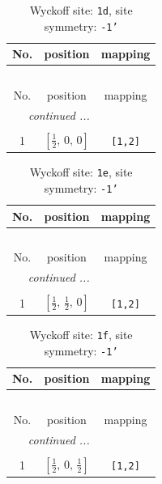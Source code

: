 \documentclass[fleqn,8pt]{jsarticle}
\begin{document}
\renewcommand{\arraystretch}{1.2}
\begin{longtable}{ccc}
\caption{Wyckoff site: {\tt 1d}, site symmetry: {\tt -1'}}
 \\
 \hline \hline
No. & position & mapping \\ \hline \endfirsthead

\multicolumn{2}{l}{\tablename\ \thetable{}} \\
 \hline \hline
No. & position & mapping \\ \hline \endhead

 \hline \hline
\multicolumn{2}{r}{\footnotesize\it continued ...} \\ \endfoot

 \hline \hline
\multicolumn{2}{r}{} \\ \endlastfoot

1 & $\left[ \frac{1}{2},\, 0,\, 0 \right]$ & {\tt [1,2]} \\
\end{longtable}
\renewcommand{\arraystretch}{1.2}
\begin{longtable}{ccc}
\caption{Wyckoff site: {\tt 1e}, site symmetry: {\tt -1'}}
 \\
 \hline \hline
No. & position & mapping \\ \hline \endfirsthead

\multicolumn{2}{l}{\tablename\ \thetable{}} \\
 \hline \hline
No. & position & mapping \\ \hline \endhead

 \hline \hline
\multicolumn{2}{r}{\footnotesize\it continued ...} \\ \endfoot

 \hline \hline
\multicolumn{2}{r}{} \\ \endlastfoot

1 & $\left[ \frac{1}{2},\, \frac{1}{2},\, 0 \right]$ & {\tt [1,2]} \\
\end{longtable}
\renewcommand{\arraystretch}{1.2}
\begin{longtable}{ccc}
\caption{Wyckoff site: {\tt 1f}, site symmetry: {\tt -1'}}
 \\
 \hline \hline
No. & position & mapping \\ \hline \endfirsthead

\multicolumn{2}{l}{\tablename\ \thetable{}} \\
 \hline \hline
No. & position & mapping \\ \hline \endhead

 \hline \hline
\multicolumn{2}{r}{\footnotesize\it continued ...} \\ \endfoot

 \hline \hline
\multicolumn{2}{r}{} \\ \endlastfoot

1 & $\left[ \frac{1}{2},\, 0,\, \frac{1}{2} \right]$ & {\tt [1,2]} \\
\end{longtable}
\end{document}
